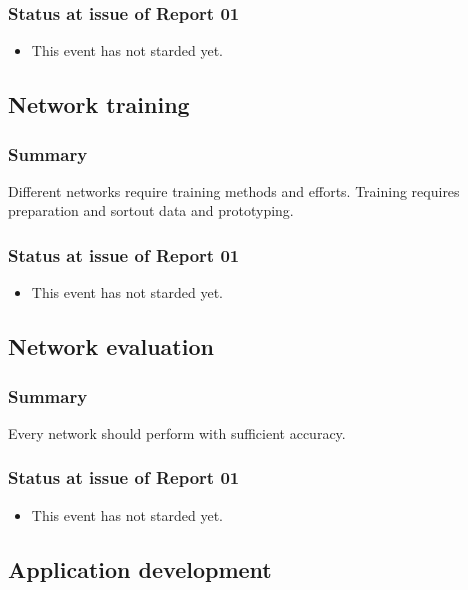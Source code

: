 \documentclass{article}
\begin{document}
\subsubsection{Status at issue of Report 01}
\label{sec:orgaffab84}
\begin{itemize}
\item This event has not starded yet.
\end{itemize}

\subsection{Network training}
\label{sec:orgeadc035}
\subsubsection{Summary}
\label{sec:org9328728}
Different networks require training methods and efforts.
Training requires preparation and sortout data and prototyping.

\subsubsection{Status at issue of Report 01}
\label{sec:org08cae8a}
\begin{itemize}
\item This event has not starded yet.
\end{itemize}

\subsection{Network evaluation}
\label{sec:org760e603}
\subsubsection{Summary}
\label{sec:orgd97aca4}
Every network should perform with sufficient accuracy.
\subsubsection{Status at issue of Report 01}
\label{sec:org4550d29}
\begin{itemize}
\item This event has not starded yet.
\end{itemize}

\subsection{Application development}
\label{sec:org35b4e6d}
\end{document}
